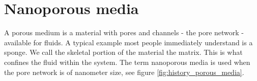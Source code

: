 \section{Nanoporous media}
\label{sec:nanoporous_media}
A porous medium is a material with pores and channels - the pore network - available for fluids. A typical example most people immediately understand is a sponge. We call the skeletal portion of the material the matrix. This is what confines the fluid within the system. The term nanoporous media is used when the pore network is of nanometer size, see figure \ref{fig:history_porous_media}. 

